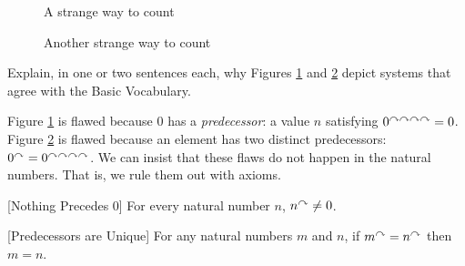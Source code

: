 \begin{figure}[h]
  \centering
  \caption{A strange way to count}
  \label{fig:one-loop}
\end{figure}

\begin{figure}[h]
  \centering
  \caption{Another strange way to count}
  \label{fig:two-loop}
\end{figure}

\begin{exercises}
\begin{exerciselist}
\item Explain, in one or two sentences each, why Figures \ref{fig:one-loop} and \ref{fig:two-loop} depict systems that agree with the Basic Vocabulary.
\end{exerciselist}
\end{exercises}
\ipadbreak

Figure \ref{fig:one-loop} is flawed because $0$ has a
\emph{predecessor}: a value $n$ satisfying $0^{\curvearrowright\curvearrowright\curvearrowright\curvearrowright} = 0$. Figure
\ref{fig:two-loop} is flawed because an element has two distinct
predecessors: $0^\curvearrowright = 0^{\curvearrowright\curvearrowright\curvearrowright\curvearrowright}$.  We can insist that
these flaws do not happen in the natural numbers. That is, 
we rule them out with axioms.

\begin{postulate}\label{ax:NatZero}[Nothing Precedes $0$]
  For every natural number $n$, $n^\curvearrowright\neq 0$.
\end{postulate}

\begin{postulate}\label{ax:NatPred}[Predecessors are Unique]
  For any natural numbers $m$ and $n$, if $m^\curvearrowright=n^\curvearrowright$ then $m=n$.
\end{postulate}

